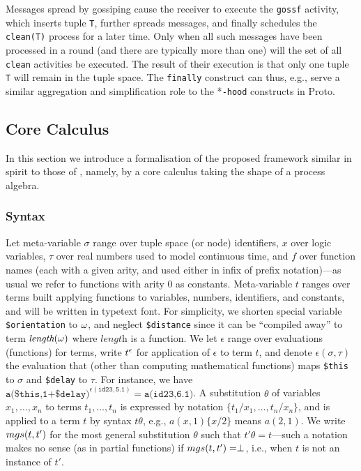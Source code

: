 \documentclass[12pt,a4paper,twoside,openright]{book}
\begin{document}
\noindent Messages spread by gossiping cause the receiver to execute the \texttt{gossf} activity, which inserts tuple \texttt{T}, further spreads messages, and finally schedules the \texttt{clean(T)} process for a later time.
%
Only when all such messages have been processed in a round (and there are typically more than one) will the set of all \texttt{clean} activities be executed.
%
The result of their execution is that only one tuple \texttt{T} will remain in the tuple space.  The \texttt{finally} construct can thus, e.g., serve a similar aggregation and simplification role to the *\texttt{-hood} constructs in Proto.

\subsection{Core Calculus}

In this section we introduce a formalisation of the proposed framework similar in spirit to those of \cite{zavattaro,klaim,biochemicalTupleSpaces}, namely, by a core calculus taking the shape of a process algebra.

\subsubsection{Syntax}

Let meta-variable $\sigma$ range over tuple space (or node) identifiers, $x$ over logic variables, $\tau$ over real numbers used to model continuous time, and $f$ over function names (each with a given arity, and used either in infix of prefix notation)---as usual we refer to functions with arity 0 as constants.
%
Meta-variable $t$ ranges over terms built applying functions to variables, numbers, identifiers, and constants, and will be written in typetext font.
%
For simplicity, we shorten special variable \texttt{\$orientation} to $\omega$, and neglect \texttt{\$distance} since it can be ``compiled away'' to term $\textit{length}(\omega)$ where $\textit{length}$ is a function.
%
We let $\epsilon$ range over evaluations (functions) for terms, write $t^\epsilon$ for application of $\epsilon$ to term $t$, and denote $\epsilon(\sigma,\tau)$ the evaluation that (other than computing mathematical functions) maps \texttt{\$this} to $\sigma$ and \texttt{\$delay} to $\tau$.
%
For instance, we have $\texttt{a(\$this,1+\$delay)}^{\epsilon(\texttt{id23},\texttt{5.1})}=\texttt{a(id23,6.1)}$.
%
A substitution $\theta$ of variables $x_1,\ldots,x_n$ to terms $t_1,\ldots,t_n$ is expressed by notation $\{t_1/x_1,\ldots,t_n/x_n\}$, and is applied to a term $t$ by syntax $t\theta$, e.g., $a(x,1)\{x/2\}$ means $a(2,1)$.
%
We write $mgs(t,t')$ for the most general substitution $\theta$ such that $t'\theta=t$---such a notation makes no sense (as in partial functions) if $mgs(t,t')=\perp$, i.e., when $t$ is not an instance of $t'$.
\end{document}
